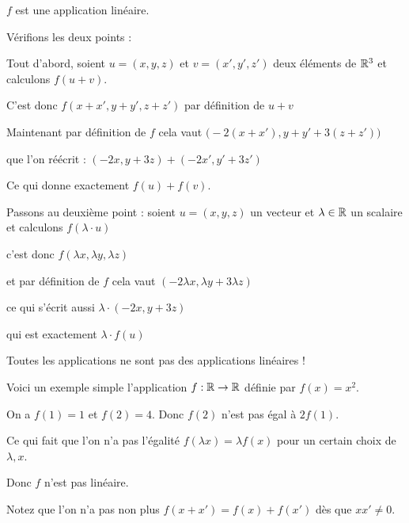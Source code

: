 $f$ est une application linéaire. 


\change

Vérifions les deux points :

Tout d'abord, soient  $u=(x,y,z)$ et $v=(x',y',z')$ 
deux éléments de $\mathbb{R}^3$ 
et calculons $f(u+v)$.

\change

C'est donc $f(x+x', y+y', z+z')$ par définition de $u+v$

\change

Maintenant par définition de $f$ cela vaut $\big(-2(x+x'), y+y' + 3(z+z')\big)$

\change

que l'on réécrit :
$(-2x, y+3z)+(-2x', y'+3z')$

\change

Ce qui donne exactement $f(u)+f(v)$.

\change

Passons au deuxième point : soient  $u=(x,y,z)$ un vecteur et $\lambda \in \mathbb{R}$ un scalaire
et calculons $f(\lambda \cdot u)$

\change

c'est donc $f(\lambda x, \lambda y, \lambda z)$

\change

et par définition de $f$ cela vaut $(-2\lambda x,   \lambda y + 3\lambda z)$

\change

ce qui s'écrit aussi $\lambda \cdot (-2x,y+3z)$

\change

qui est exactement $\lambda \cdot f(u)$


\diapo

Toutes les applications ne sont pas des applications linéaires !

Voici un exemple simple l'application $f : \mathbb{R} \to \mathbb{R}$ définie par $f(x)=x^2$.

\change

On a $f(1)=1$ et $f(2)=4$. Donc $f(2)$ n'est pas égal à $2f(1)$. 

\change

Ce qui fait
que l'on n'a pas l'égalité $f(\lambda x)=\lambda f(x)$ pour un certain choix de $\lambda,x$.

\change

Donc $f$ n'est pas linéaire. 

\change

Notez que l'on n'a pas non plus $f(x+x')=f(x)+f(x')$ dès que $xx'\neq0$.


